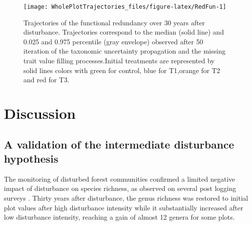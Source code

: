\documentclass[fleqn,10pt]{ArtEcoFoG} %
\theoremstyle{definition}
\theoremstyle{definition}
\theoremstyle{definition}
\theoremstyle{remark}
\begin{document}
\begin{figure}

{\centering \texttt{[image: WholePlotTrajectories\_files/figure-latex/RedFun-1]} 

}

\caption{Trajectories of the functional redundancy over 30 years after disturbance. Trajectories correspond to the median (solid line) and 0.025 and 0.975 percentile (gray envelope) observed after 50 iteration of the taxonomic uncertainty propagation and the missing trait value filling processes.Initial treatments are represented by solid lines colors with green for control, blue for T1,orange for T2 and red for T3.}\label{fig:RedFun}
\end{figure}

\section{Discussion}\label{discussion}

\subsection{A validation of the intermediate disturbance
hypothesis}\label{a-validation-of-the-intermediate-disturbance-hypothesis}

The monitoring of disturbed forest communities confirmed a limited
negative impact of disturbance on species richness, as observed on
several post logging surveys \citep{Cannon1998, Baraloto2012a}. Thirty
years after disturbance, the genus richness was restored to initial plot
values after high disturbance intensity while it substantially increased
after low disturbance intensity, reaching a gain of almost 12 genera for
some plots.
\end{document}
